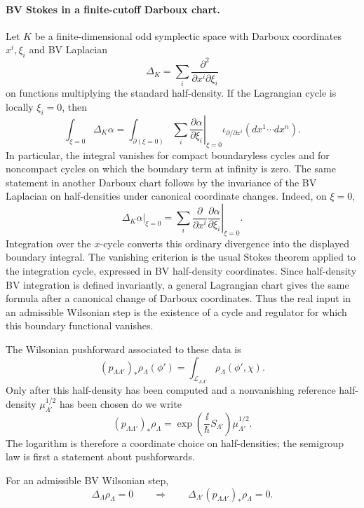 \paragraph{BV Stokes in a finite-cutoff Darboux chart.}
Let \(K\) be a finite-dimensional odd symplectic space with Darboux
coordinates \(x^i,\xi_i\) and BV Laplacian
\[
  \Delta_K=\sum_i\frac{\partial^2}{\partial x^i\partial \xi_i}
\]
on functions multiplying the standard half-density.  If the Lagrangian cycle
is locally \(\xi_i=0\), then
\[
  \int_{\xi=0}\Delta_K\alpha
  =
  \int_{\partial(\xi=0)}
  \sum_i
  \left.
  \frac{\partial \alpha}{\partial \xi_i}
  \right|_{\xi=0}
  \iota_{\partial/\partial x^i}(dx^1\cdots dx^n).
\]
In particular, the integral vanishes for compact boundaryless cycles and for
noncompact cycles on which the boundary term at infinity is zero.  The same
statement in another Darboux chart follows by the invariance of the BV
Laplacian on half-densities under canonical coordinate changes.
Indeed, on \(\xi=0\),
\[
  \left.\Delta_K\alpha\right|_{\xi=0}
  =
  \sum_i
  \frac{\partial}{\partial x^i}
  \left.
  \frac{\partial\alpha}{\partial\xi_i}
  \right|_{\xi=0}.
\]
Integration over the \(x\)-cycle converts this ordinary divergence into the
displayed boundary integral.  The vanishing criterion is the usual Stokes
theorem applied to the integration cycle, expressed in BV half-density
coordinates.  Since half-density BV integration is defined invariantly, a
general Lagrangian chart gives the same formula after a canonical change of
Darboux coordinates.  Thus the real input in an admissible Wilsonian step is
the existence of a cycle and regulator for which this boundary functional
vanishes.

The Wilsonian pushforward associated to these data is
\begin{equation}
  (p_{\Lambda\Lambda'})_*\rho_\Lambda(\phi')
  =
  \int_{\mathcal L_{\Lambda\Lambda'}}
  \rho_\Lambda(\phi',\chi).
  \label{eq:bv-wilsonian-pushforward-half-density}
\end{equation}
Only after this half-density has been computed and a nonvanishing reference
half-density \(\mu_{\Lambda'}^{1/2}\) has been chosen do we write
\[
  (p_{\Lambda\Lambda'})_*\rho_\Lambda
  =
  \exp\!\left(\frac{\ii}{\hbar}S_{\Lambda'}\right)
  \mu_{\Lambda'}^{1/2}.
\]
The logarithm is therefore a coordinate choice on half-densities; the
semigroup law is first a statement about pushforwards.

\begin{proposition}
\label{prop:bv-pushforward-preserves-qme}
For an admissible BV Wilsonian step,
\[
  \Delta_\Lambda\rho_\Lambda=0
  \qquad\Longrightarrow\qquad
  \Delta_{\Lambda'}(p_{\Lambda\Lambda'})_*\rho_\Lambda=0 .
\]
\end{proposition}

